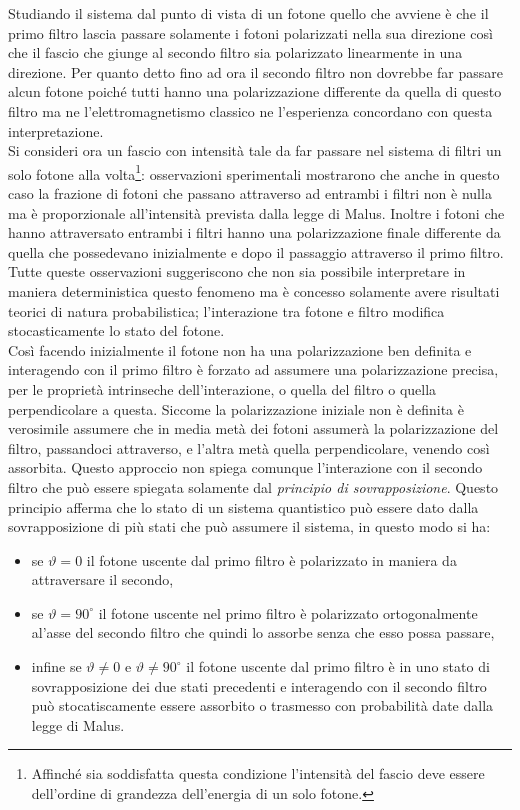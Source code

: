 Studiando il sistema dal punto di vista di un fotone quello che avviene è che il primo filtro lascia passare solamente i fotoni polarizzati nella sua direzione così che il fascio che giunge al secondo filtro sia polarizzato linearmente in una direzione. Per quanto detto fino ad ora il secondo filtro non dovrebbe far passare alcun fotone poiché tutti hanno una polarizzazione differente da quella di questo filtro ma ne l'elettromagnetismo classico ne l'esperienza concordano con questa interpretazione.\\ Si consideri ora un fascio con intensità tale da far passare nel sistema di filtri un solo fotone alla volta\footnote{Affinché sia soddisfatta questa condizione l'intensità del fascio deve essere dell'ordine di grandezza dell'energia di un solo fotone.}: osservazioni sperimentali mostrarono che anche in questo caso la frazione di fotoni che passano attraverso ad entrambi i filtri non è nulla ma è proporzionale all'intensità prevista dalla legge di Malus. Inoltre i fotoni che hanno attraversato entrambi i filtri hanno una polarizzazione finale differente da quella che possedevano inizialmente e dopo il passaggio attraverso il primo filtro. Tutte queste osservazioni suggeriscono che non sia possibile interpretare in maniera deterministica questo fenomeno ma è concesso solamente avere risultati teorici di natura probabilistica; l'interazione tra fotone e filtro modifica stocasticamente lo stato del fotone.\\
Così facendo inizialmente il fotone non ha una polarizzazione ben definita e interagendo con il primo filtro è forzato ad assumere una polarizzazione precisa, per le proprietà intrinseche dell'interazione, o quella del filtro o quella perpendicolare a questa. Siccome la polarizzazione iniziale non è definita è verosimile assumere che in media metà dei fotoni assumerà la polarizzazione del filtro, passandoci attraverso, e l'altra metà quella perpendicolare, venendo così assorbita. Questo approccio non spiega comunque l'interazione con il secondo filtro che può essere spiegata solamente dal \emph{principio di sovrapposizione}. Questo principio afferma che lo stato di un sistema quantistico può essere dato dalla sovrapposizione di più stati che può assumere il sistema, in questo modo si ha:
\begin{itemize}
    \item se $\vartheta=0$ il fotone uscente dal primo filtro è polarizzato in maniera da attraversare il secondo,
    \item se $\vartheta=90^\circ$ il fotone uscente nel primo filtro è polarizzato ortogonalmente al'asse del secondo filtro che quindi lo assorbe senza che esso possa passare,
    \item infine se $\vartheta\neq0$ e $\vartheta\neq90^\circ$ il fotone uscente dal primo filtro è in uno stato di sovrapposizione dei due stati precedenti e interagendo con il secondo filtro può stocatiscamente essere assorbito o trasmesso con probabilità date dalla legge di Malus.
\end{itemize}
